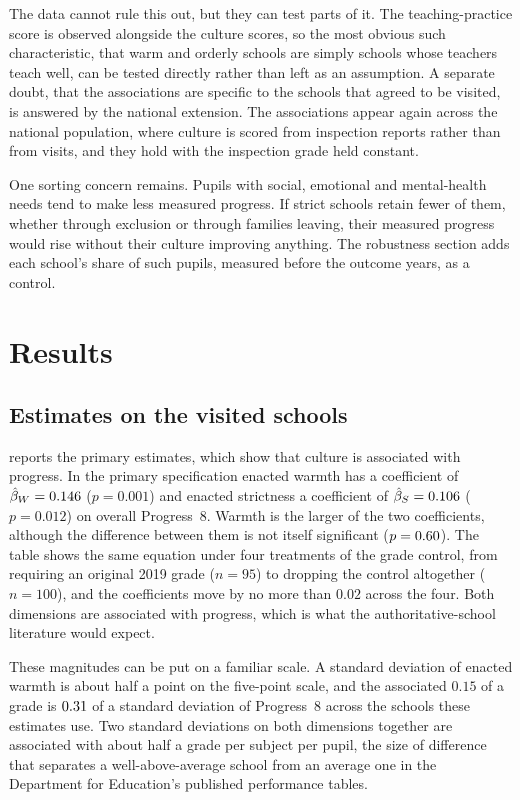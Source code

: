 The data cannot rule this out, but they can test parts of it. The teaching-practice score is observed alongside the culture scores, so the most obvious such characteristic, that warm and orderly schools are simply schools whose teachers teach well, can be tested directly rather than left as an assumption. A separate doubt, that the associations are specific to the schools that agreed to be visited, is answered by the national extension. The associations appear again across the national population, where culture is scored from inspection reports rather than from visits, and they hold with the inspection grade held constant.

One sorting concern remains. Pupils with social, emotional and mental-health needs tend to make less measured progress. If strict schools retain fewer of them, whether through exclusion or through families leaving, their measured progress would rise without their culture improving anything. The robustness section adds each school's share of such pupils, measured before the outcome years, as a control.

\section{Results}
\label{sec:p2_results}

\subsection{Estimates on the visited schools}

 reports the primary estimates, which show that culture is associated with progress. In the primary specification enacted warmth has a
coefficient of $\hat{\beta}_W = 0.146$ ($p = 0.001$) and enacted strictness a coefficient of $\hat{\beta}_S = 0.106$ ($p = 0.012$) on overall Progress~8. Warmth is the larger of the two
coefficients, although the difference between them is not itself
significant ($p = 0.60$). The table shows the same equation
under four treatments of the grade control, from requiring an original 2019
grade ($n = 95$) to dropping the control altogether ($n = 100$), and the
coefficients move by no more than $0.02$ across the four. Both dimensions are associated with progress, which is what the authoritative-school literature would expect.



These magnitudes can be put on a familiar scale. A standard deviation of enacted warmth is about half a point on the five-point scale, and the associated $0.15$ of a grade is $0.31$ of a standard deviation of Progress~8 across the schools these estimates use. Two standard deviations on both dimensions together are associated with about half a grade per subject per pupil, the size of difference that separates a well-above-average school from an average one in the Department for Education's published performance tables.

